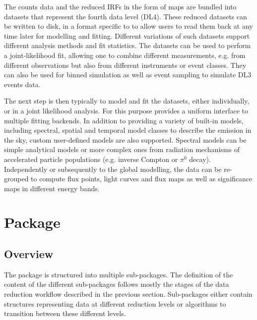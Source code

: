 \documentclass[longauth]{aa}
\begin{document}
The counts data and the reduced IRFs in the form of maps are bundled into datasets
that represent the fourth data level (DL4). These reduced datasets can be written to disk,
in a format specific to \gammapy to allow users to read them back at any time later
for modelling and fitting. Different variations of such datasets support different 
analysis methods and fit statistics. The datasets can be used to perform a joint-likelihood
fit, allowing one to combine different measurements, e.g. from different observations
but also from different instruments or event classes. They can also be used for binned
simulation as well as event sampling to simulate DL3 events data.

The next step is then typically to model and fit the datasets, either
individually, or in a joint likelihood analysis. For this purpose \gammapy
provides a uniform interface to multiple fitting backends. In addition to
providing a variety of built-in models, including spectral,
spatial and temporal model classes to describe the \gammaray emission in the sky,
custom user-defined models are also supported.
Spectral models can be simple analytical models or more complex ones from radiation
mechanisms of accelerated particle populations (e.g. inverse Compton or $\pi^{0}$ decay).
Independently or subsequently to the global modelling, the data can be
re-grouped to compute flux points, light curves and flux maps as well as significance
maps in different energy bands.

\section{\gammapy Package}
\label{sec:gammapy-package}
\subsection{Overview}
\label{ssec:overview}
%
%
The \gammapy package is structured into multiple sub-packages. The definition
of the content of the different sub-packages follows mostly the stages of the
data reduction workflow described in the previous section. Sub-packages
either contain structures representing data at different reduction
levels or algorithms to transition between these different levels.
\end{document}
